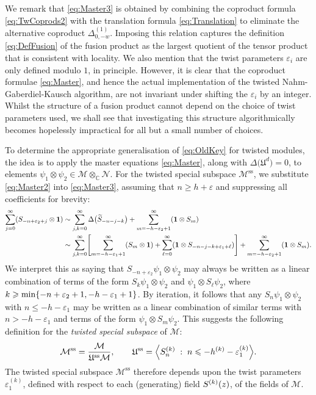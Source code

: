\documentclass[a4paper,reqno,12pt]{report}
\theoremstyle{definition}
\numberwithin{equation}{section}
\let\originalleft\left     %
\let\originalright\right
\renewcommand{\left}{\mathopen{}\mathclose\bgroup\originalleft}
\renewcommand{\right}{\aftergroup\egroup\originalright}
\newcommand{\alg}[1]{\mathfrak{#1}} %
\newcommand{\func}[2]{#1 \left( #2 \right)} %
\newcommand{\brac}[1]{\left( #1 \right)}
\newcommand{\sqbrac}[1]{\left[ #1 \right]}
\newcommand{\set}[1]{\left\{ #1 \right\}}
\newcommand{\st}{\mspace{5mu} : \mspace{5mu}} %
\newcommand{\CC}{\mathbb{C}}
\newcommand{\wun}{\mathbf{1}}  %
\newcommand{\spsub}[1]{#1^{\text{ss}}}       %
\newcommand{\coproductsymb}{\Delta}                                                %
\newcommand{\coproduct}[1]{\coproductsymb \bigl( #1 \bigr)}                        %
\newcommand{\Ncoproductsymb}[1]{\coproductsymb^{(#1)}}                             %
\newcommand{\parNcoproductsymb}[2]{\Ncoproductsymb{#1}_{#2}}                       %
\newcommand{\NGK}{Nahm-Gaberdiel-Kausch}
\newcommand{\eps}{\varepsilon}
\newcommand{\tS}{\widetilde{S}}
\renewcommand{\ge}{\geqslant}
\renewcommand{\le}{\leqslant}
\theoremstyle{plain}
\newcommand{\Mod}[1]{\mathcal{#1}}                 %
\begin{document}
We remark that \eqref{eq:Master3} is obtained by combining the coproduct formula \eqref{eq:TwCoprods2} with the translation formula \eqref{eq:Translation} to eliminate the alternative coproduct $\parNcoproductsymb{1}{0,-w}$.  Imposing this relation captures the definition \eqref{eq:DefFusion} of the fusion product as the largest quotient of the tensor product that is consistent with locality.  We also mention that the twist parameters $\eps_i$ are only defined modulo $1$, in principle.  However, it is clear that the coproduct formulae \eqref{eq:Master}, and hence the actual implementation of the twisted \NGK{} algorithm, are not invariant under shifting the $\eps_i$ by an integer.  Whilst the structure of a fusion product cannot depend on the choice of twist parameters used, we shall see that investigating this structure algorithmically becomes hopelessly impractical for all but a small number of choices.

To determine the appropriate generalisation of \eqref{eq:OldKey} for twisted modules, the idea is to apply the master equations \eqref{eq:Master}, along with $\coproduct{\alg{U}^d} = 0$, to elements $\psi_1 \otimes \psi_2 \in \Mod{M} \otimes_{\CC} \Mod{N}$.  For the twisted special subspace $\spsub{\Mod{M}}$, we substitute \eqref{eq:Master2} into \eqref{eq:Master3}, assuming that $n \ge h + \eps$ and suppressing all coefficients for brevity:
\begin{align}
\sum_{j=0}^{\infty} \brac{S_{-n+\eps_2+j} \otimes \wun} &\sim \sum_{j,k=0}^{\infty} \coproduct{\tS_{-n-j-k}} + \sum_{m=-h-\eps_2+1}^{\infty} \brac{\wun \otimes S_m} \notag \\
&\sim \sum_{j,k=0}^{\infty} \sqbrac{\sum_{m=-h-\eps_1+1}^{\infty} \brac{S_m \otimes \wun} + \sum_{\ell=0}^{\infty} \brac{\wun \otimes S_{-n-j-k+\eps_1+\ell}}} + \sum_{m=-h-\eps_2+1}^{\infty} \brac{\wun \otimes S_m}.
\end{align}
We interpret this as saying that $S_{-n+\eps_2} \psi_1 \otimes \psi_2$ may always be written as a linear combination of terms of the form $S_k \psi_1 \otimes \psi_2$ and $\psi_1 \otimes S_{\ell} \psi_2$, where $k \ge \min \set{-n+\eps_2+1, -h-\eps_1+1}$.  By iteration, it follows that any $S_n \psi_1 \otimes \psi_2$ with $n \le -h-\eps_1$ may be written as a linear combination of similar terms with $n > -h-\eps_1$ and terms of the form $\psi_1 \otimes S_m \psi_2$.  This suggests the following definition for the \emph{twisted special subspace} of $\Mod{M}$:
\begin{equation}
\spsub{\Mod{M}} = \frac{\Mod{M}}{\spsub{\alg{U}} \Mod{M}}, \qquad 
\spsub{\alg{U}} = \left\langle S^{(k)}_n \st n \le -h^{(k)}-\eps_1^{(k)} \right\rangle.
\end{equation}
The twisted special subspace $\spsub{\Mod{M}}$ therefore depends upon the twist parameters $\eps_1^{(k)}$, defined with respect to each (generating) field $\func{S^{(k)}}{z}$, of the fields of $\Mod{M}$.
\end{document}
